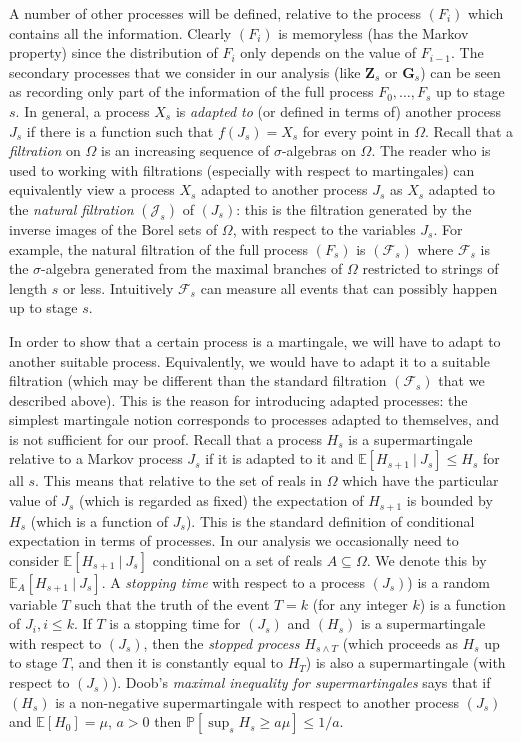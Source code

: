 \documentclass[11pt]{article}
\theoremstyle{plain}
\numberwithin{equation}{subsection}
\newcommand{\ZZ}{\mathbf{Z}}
\newcommand{\GG}{\mathbf{G}}
\DeclareRobustCommand{\expe}[2][{\mbox{$\mathbb{E}$}}]{\ensuremath {#1}\left[ {#2} \right]}
\DeclareRobustCommand{\expec}[3][{\mbox{$\mathbb{E}$}}]{\ensuremath {#1}\left[ {#2} \ \big|\  {#3} \right]}
\DeclareRobustCommand{\expeco}[4][{\mbox{$\mathbb{E}$}}]{\ensuremath {#1}_{#4}\left[{#2} \ \big|\  {#3} \right]}
\DeclareRobustCommand{\proba}[2][{\mbox{$\mathbb{P}$}}]{\ensuremath {#1} [ {#2} ]}
\begin{document}
A number of other processes will be defined, relative to the process $(F_i)$ which contains all the information. Clearly 
$(F_i)$ is memoryless (has the Markov property) since the distribution of $F_i$ only depends on the value of $F_{i-1}$.
The secondary processes that we consider in our analysis (like $\ZZ_s$ or $\GG_s$) 
can be seen as recording only part of the information of the full process
$F_0,\dots, F_s$ up to stage $s$. 
In general, a process $X_s$ is {\em adapted to} (or defined in terms of) another process 
$J_s$ if there is a function such that
$f(J_s)=X_s$ for every point in $\Omega$. 
Recall that a {\em filtration} on $\Omega$ is an increasing sequence of $\sigma$-algebras on $\Omega$.
The reader who is used to working with filtrations (especially with respect to martingales) can equivalently view
a process $X_s$ adapted to another process $J_s$ as $X_s$ adapted to the {\em natural 
filtration} $(\mathcal{J}_s)$ of $(J_s)$: this is the filtration generated by the inverse images 
of the Borel sets of $\Omega$, with respect to the variables
$J_s$.
For example, the natural filtration of the full process $(F_s)$ is 
$(\mathcal{F}_s)$ where $\mathcal{F}_s$ is the $\sigma$-algebra generated
from the maximal branches of $\Omega$ restricted to  strings of length $s$ or less. 
Intuitively $\mathcal{F}_s$ can measure all events that can possibly
happen up to stage $s$.   

In order to show that a certain process is a martingale, we will have to adapt to another suitable process. 
Equivalently, we would have to adapt
it to a suitable filtration (which may be different than the standard filtration $(\mathcal{F}_s)$ that we described above).
This is the reason for introducing adapted processes: the simplest martingale notion corresponds to 
processes adapted to themselves, and is not sufficient for our proof. 
Recall that a process $H_s$ is a supermartingale relative to a Markov process $J_s$ if it is adapted to it and
$\expec{H_{s+1}}{J_s}\leq H_s$ for all $s$. This means that relative to the set of reals in $\Omega$
which have the particular value of $J_s$ (which is regarded as fixed) the expectation of $H_{s+1}$ is bounded by
$H_s$ (which is a function of $J_s$). This is the standard definition of conditional expectation in terms of processes.
In our analysis we occasionally need to consider $\expec{H_{s+1}}{J_s}$ conditional on a set of reals 
$A\subseteq\Omega$. We denote this by $\expeco{H_{s+1}}{J_s}{A}$.
A {\em stopping time} with respect to a process $(J_s)$) 
is a random variable $T$ such that the truth of the event $T=k$ (for any integer $k$) 
is a function of $J_i, i\leq k$. 
If $T$ is a stopping time for $(J_s)$ and $(H_s)$ is a supermartingale with respect to 
$(J_s)$, then the {\em stopped process}
$H_{s\wedge T}$ (which proceeds as $H_s$ up to stage $T$, and then it is constantly 
equal to $H_T$) is also a supermartingale (with respect to $(J_s)$). 
Doob's {\em maximal inequality for supermartingales} says that if $(H_s)$ is a non-negative 
supermartingale with respect to another process $(J_s)$ and  $\expe{H_0}=\mu$,  $a>0$ then
$\proba{\sup_s H_s\geq a\mu}\leq 1/a$.
\end{document}
